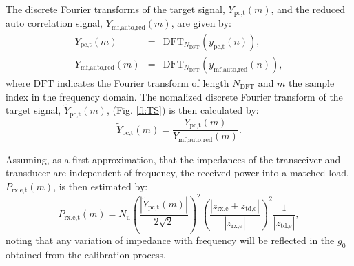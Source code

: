 \documentclass[preprint,12pt,TurnOnLineNumbers]{JASAnew}
\newcommand{\samplesymt}{n}
\newcommand{\samplesymf}{m}
\newcommand{\nchannels}{N_{\textrm{u}}}
\newcommand{\zrxe}{z_{\textrm{rx,e}}}
\newcommand{\ztde}{z_{\textrm{td,e}}}
\newcommand{\ypctarget}{y_{\textrm{pc,t}}}
\newcommand{\ymfautored}{y_{\textrm{mf,auto,red}}}
\newcommand{\ypctargetf}{Y_{\textrm{pc,t}}}
\newcommand{\ypctargetnormf}{\tilde{Y}_{\textrm{pc,t}}}
\newcommand{\ymfautoredf}{Y_{\textrm{mf,auto,red}}}
\newcommand{\prxetf}{P_{\textrm{rx,e,t}}}
\newcommand{\gainzero}{g_0}
\newcommand{\dft}{\textrm{DFT}}
\newcommand{\ndft}{{N_{\textrm{DFT}}}}
\begin{document}
The discrete Fourier transforms of the target signal, $\ypctargetf(\samplesymf)$, and the reduced auto correlation signal, $\ymfautoredf(\samplesymf)$, are given by:
\begin{eqnarray}
\label{eq:DFT_Target_Auto}
\ypctargetf(\samplesymf) & = & \dft_\ndft(\ypctarget(\samplesymt)),\\
\ymfautoredf(\samplesymf) & = & \dft_\ndft(\ymfautored(\samplesymt)),
\end{eqnarray}
where $\dft$ indicates the Fourier transform of length $\ndft$ and $\samplesymf$ the sample index in the frequency domain.
The nomalized discrete Fourier transform of the target signal, $\ypctargetnormf(\samplesymf)$, (Fig. \ref{fi:TS}) is then calculated by: 
%
\begin{equation}
\label{eq:DFT_Target_Auto_Norm}
\ypctargetnormf(\samplesymf) = \frac{\ypctargetf(\samplesymf)} {\ymfautoredf(\samplesymf)}.
\end{equation}

Assuming, as a first approximation, that the impedances of the transceiver and transducer are independent of frequency, the received power into a matched load, $\prxetf(\samplesymf)$, is then estimated by:
\begin{equation}
\label{eq:prx_FFT_target}
\prxetf(\samplesymf) = \nchannels\left( \frac{|\ypctargetnormf(\samplesymf)|}{2\sqrt{2}} \right)^2 
\left( \frac{|\zrxe+\ztde|}{|\zrxe|}\right)^2 \frac{1}{|\ztde|}, %
\end{equation}
%
noting that any variation of impedance with frequency will be reflected in the $\gainzero$ obtained from the calibration process.
\end{document}
